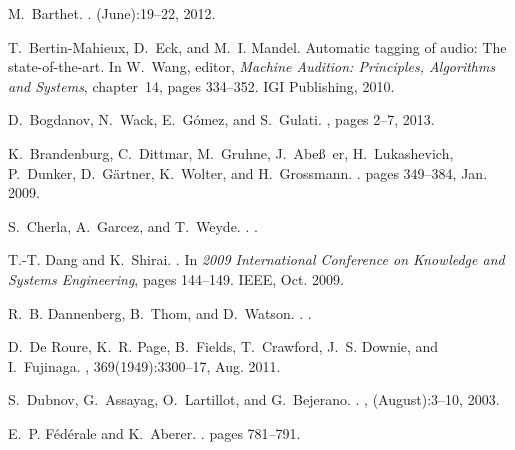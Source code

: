 \documentclass{proc}
\begin{document}
\begin{thebibliography}{10}

M.~Barthet.
.
\newblock (June):19--22, 2012.

T.~Bertin-Mahieux, D.~Eck, and M.~I. Mandel.
\newblock Automatic tagging of audio: The state-of-the-art.
\newblock In W.~Wang, editor, {\em Machine Audition: Principles, Algorithms and
  Systems}, chapter~14, pages 334--352. IGI Publishing, 2010.

D.~Bogdanov, N.~Wack, E.~G\'{o}mez, and S.~Gulati.
, pages 2--7, 2013.

K.~Brandenburg, C.~Dittmar, M.~Gruhne, J.~Abe\ss~er, H.~Lukashevich, P.~Dunker,
  D.~G\"{a}rtner, K.~Wolter, and H.~Grossmann.
.
\newblock pages 349--384, Jan. 2009.

S.~Cherla, A.~Garcez, and T.~Weyde.
.
.

T.-T. Dang and K.~Shirai.
.
\newblock In {\em 2009 International Conference on Knowledge and Systems
  Engineering}, pages 144--149. IEEE, Oct. 2009.

R.~B. Dannenberg, B.~Thom, and D.~Watson.
.
.

D.~{De Roure}, K.~R. Page, B.~Fields, T.~Crawford, J.~S. Downie, and
  I.~Fujinaga.
, 369(1949):3300--17, Aug. 2011.

S.~Dubnov, G.~Assayag, O.~Lartillot, and G.~Bejerano.
.
, (August):3--10, 2003.

E.~P. F\'{e}d\'{e}rale and K.~Aberer.
.
\newblock pages 781--791.


\end{thebibliography}
\end{document}
